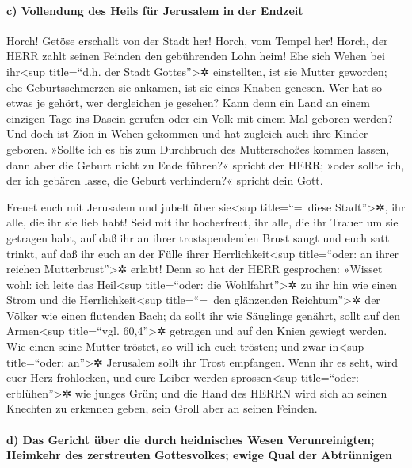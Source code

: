 \hypertarget{c-vollendung-des-heils-fuxfcr-jerusalem-in-der-endzeit}{%
\paragraph{c) Vollendung des Heils für Jerusalem in der
Endzeit}\label{c-vollendung-des-heils-fuxfcr-jerusalem-in-der-endzeit}}

Horch! Getöse erschallt von der Stadt her! Horch, vom
Tempel her! Horch, der HERR zahlt seinen Feinden den gebührenden Lohn
heim! Ehe sich Wehen bei ihr\textless sup title=``d.h. der
Stadt Gottes''\textgreater✲ einstellten, ist sie Mutter geworden; ehe
Geburtsschmerzen sie ankamen, ist sie eines Knaben genesen.
Wer hat so etwas je gehört, wer dergleichen je gesehen?
Kann denn ein Land an einem einzigen Tage ins Dasein gerufen oder ein
Volk mit einem Mal geboren werden? Und doch ist Zion in Wehen gekommen
und hat zugleich auch ihre Kinder geboren. »Sollte ich es
bis zum Durchbruch des Mutterschoßes kommen lassen, dann aber die Geburt
nicht zu Ende führen?« spricht der HERR; »oder sollte ich, der ich
gebären lasse, die Geburt verhindern?« spricht dein Gott.

Freuet euch mit Jerusalem und jubelt über
sie\textless sup title=``=~diese Stadt''\textgreater✲, ihr alle, die ihr
sie lieb habt! Seid mit ihr hocherfreut, ihr alle, die ihr Trauer um sie
getragen habt, auf daß ihr an ihrer trostspendenden Brust
saugt und euch satt trinkt, auf daß ihr euch an der Fülle ihrer
Herrlichkeit\textless sup title=``oder: an ihrer reichen
Mutterbrust''\textgreater✲ erlabt! Denn so hat der HERR
gesprochen: »Wisset wohl: ich leite das Heil\textless sup title=``oder:
die Wohlfahrt''\textgreater✲ zu ihr hin wie einen Strom und die
Herrlichkeit\textless sup title=``=~den glänzenden
Reichtum''\textgreater✲ der Völker wie einen flutenden Bach; da sollt
ihr wie Säuglinge genährt, sollt auf den Armen\textless sup title=``vgl.
60,4''\textgreater✲ getragen und auf den Knien gewiegt werden.
Wie einen seine Mutter tröstet, so will ich euch trösten;
und zwar in\textless sup title=``oder: an''\textgreater✲ Jerusalem sollt
ihr Trost empfangen. Wenn ihr es seht, wird euer Herz
frohlocken, und eure Leiber werden sprossen\textless sup title=``oder:
erblühen''\textgreater✲ wie junges Grün; und die Hand des HERRN wird
sich an seinen Knechten zu erkennen geben, sein Groll aber an seinen
Feinden.

\hypertarget{d-das-gericht-uxfcber-die-durch-heidnisches-wesen-verunreinigten-heimkehr-des-zerstreuten-gottesvolkes-ewige-qual-der-abtruxfcnnigen}{%
\paragraph{d) Das Gericht über die durch heidnisches Wesen
Verunreinigten; Heimkehr des zerstreuten Gottesvolkes; ewige Qual der
Abtrünnigen}\label{d-das-gericht-uxfcber-die-durch-heidnisches-wesen-verunreinigten-heimkehr-des-zerstreuten-gottesvolkes-ewige-qual-der-abtruxfcnnigen}}

